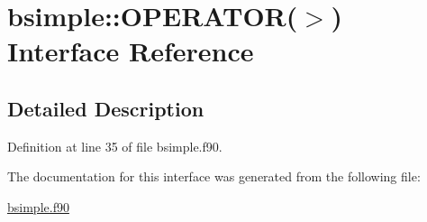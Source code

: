 \hypertarget{interfacebsimple_1_1OPERATOR_07_4_08}{
\section{bsimple::OPERATOR($>$) Interface Reference}
\label{interfacebsimple_1_1OPERATOR_07_4_08}
}


\subsection{Detailed Description}


Definition at line 35 of file bsimple.f90.

The documentation for this interface was generated from the following file:\begin{DoxyCompactItemize}
\item 
\hyperlink{bsimple_8f90}{bsimple.f90}\end{DoxyCompactItemize}
